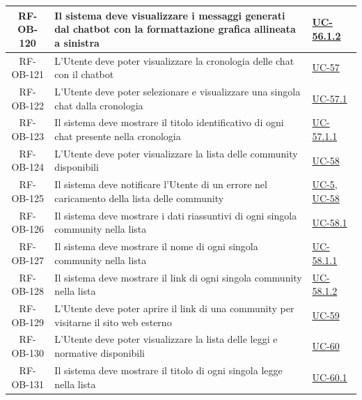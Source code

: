 \documentclass[a4paper,12pt]{article}
\begin{document}
\begin{center}
\begin{longtable}{|c|p{8.5cm}|>{\centering\arraybackslash}p{4cm}|}
RF-OB-120 & Il sistema deve visualizzare i messaggi generati dal chatbot con la formattazione grafica allineata a sinistra & \hyperref[subsec:UC-56.1.2]{UC-56.1.2} \\
\hline

RF-OB-121 & L'Utente deve poter visualizzare la cronologia delle chat con il chatbot & \hyperref[subsec:UC-57]{UC-57} \\
\hline

RF-OB-122 & L'Utente deve poter selezionare e visualizzare una singola chat dalla cronologia & \hyperref[subsec:UC-57.1]{UC-57.1} \\
\hline

RF-OB-123 & Il sistema deve mostrare il titolo identificativo di ogni chat presente nella cronologia & \hyperref[subsec:UC-57.1.1]{UC-57.1.1} \\
\hline

RF-OB-124 & L'Utente deve poter visualizzare la lista delle community disponibili & \hyperref[sec:UC-58]{UC-58} \\
\hline

RF-OB-125 & Il sistema deve notificare l'Utente di un errore nel caricamento della lista delle community & \hyperref[sec:UC-5]{UC-5}, \hyperref[sec:UC-58]{UC-58} \\
\hline

RF-OB-126 & Il sistema deve mostrare i dati riassuntivi di ogni singola community nella lista & \hyperref[subsec:UC-58.1]{UC-58.1} \\
\hline

RF-OB-127 & Il sistema deve mostrare il nome di ogni singola community nella lista & \hyperref[subsec:UC-58.1.1]{UC-58.1.1} \\
\hline

RF-OB-128 & Il sistema deve mostrare il link di ogni singola community nella lista & \hyperref[subsec:UC-58.1.2]{UC-58.1.2} \\
\hline

RF-OB-129 & L'Utente deve poter aprire il link di una community per visitarne il sito web esterno & \hyperref[sec:UC-59]{UC-59} \\
\hline

RF-OB-130 & L'Utente deve poter visualizzare la lista delle leggi e normative disponibili & \hyperref[sec:UC-60]{UC-60} \\
\hline

RF-OB-131 & Il sistema deve mostrare il titolo di ogni singola legge nella lista & \hyperref[subsec:UC-60.1]{UC-60.1} \\
\hline


\end{longtable}
\end{center}
\end{document}
